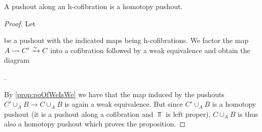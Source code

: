 \begin{corollary}\label{prop:poAlongHCofibIsHtpyPo}
    A pushout along an h-cofibration is a homotopy pushout.
    \begin{proof}
        Let
        \begin{center}
        \end{center}
        be a pushout with the indicated maps being h-cofibrations.
        We factor the map $A\xtailrightarrow{} C'\xrightarrow{\sim} C$ into a cofibration followed by a weak equivalence and obtain the diagram
        \begin{center}
            \;.
        \end{center}
        By \cref{prop:poOfWeIsWe} we have that the map induced by the pushouts $C'\cup_AB\to C\cup_AB$ is again a weak equivalence.
        But since $C'\cup_AB$ is a homotopy pushout (it is a pushout along a cofibration and $\Top$ is left proper), $C\cup_AB$ is thus also a homotopy pushout which proves the proposition.%
    \end{proof}
\end{corollary}
